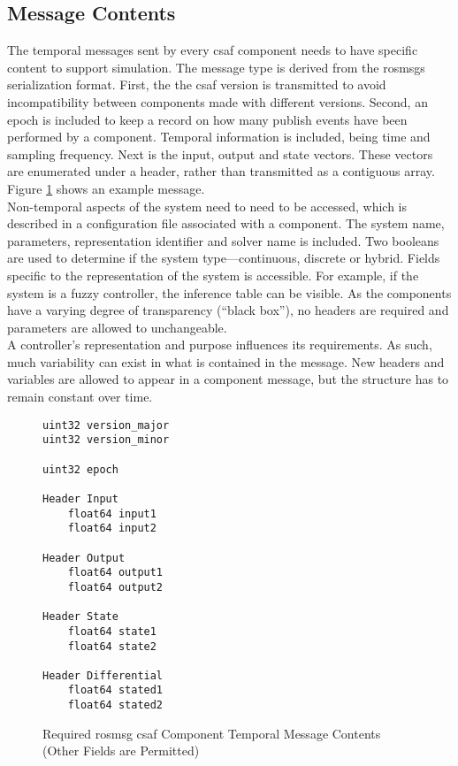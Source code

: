 \subsection{Message Contents}

The temporal messages sent by every \acrshort{csaf}  component needs to have specific content to support 
simulation. The message type is derived from the \acrshort{ros}msgs serialization format. First, the the 
\acrshort{csaf}  version is transmitted to avoid incompatibility between components made with different 
versions. Second, an epoch is included to keep a record on how many publish events have been performed 
by a component. Temporal information is included, being time and sampling frequency. Next is the input, 
output and state vectors. These vectors are enumerated under a header, rather than transmitted as a 
contiguous array. Figure \ref{fig:cmsg} shows an example message. \\

Non-temporal aspects of the system need to need to be accessed, which is described in a configuration file associated with a component. The system name, parameters, representation identifier and solver name is included. Two booleans are used to determine if the system type---continuous, discrete or hybrid.  Fields specific to the representation of the system is  accessible. For example, if the system is a fuzzy controller, the inference table can be visible. As the  components have a varying degree of transparency (``black box''), no headers are required and parameters are allowed to unchangeable. \\

A controller's representation and purpose influences its requirements. As such, much 
variability can exist in what is contained in the message. New headers and variables are allowed to appear in a 
component message, but the structure has to remain constant over time. \\

\begin{figure}
\begin{lstlisting}
uint32 version_major
uint32 version_minor

uint32 epoch

Header Input
	float64 input1
	float64 input2
	
Header Output
	float64 output1
	float64 output2
	
Header State
	float64 state1
	float64 state2
	
Header Differential
	float64 stated1
	float64 stated2
\end{lstlisting}
\caption{Required \acrshort{ros}msg \acrshort{csaf}  Component Temporal Message Contents (Other Fields are Permitted)}
\label{fig:cmsg}
\end{figure}

